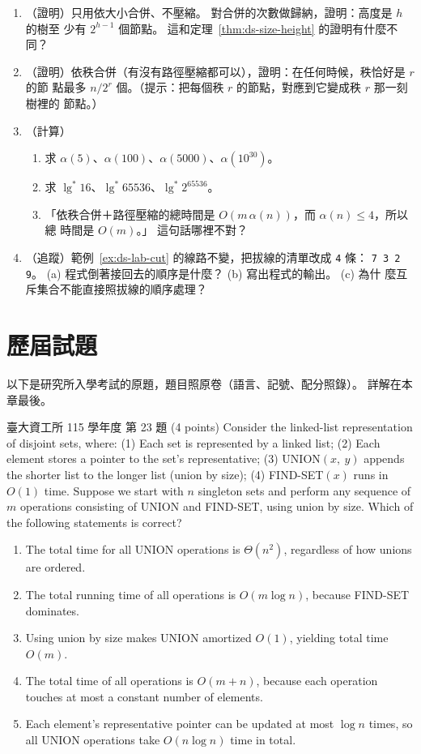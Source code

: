 \begin{enumerate}
\item （證明）只用依大小合併、不壓縮。 對合併的次數做歸納，證明：高度是 $h$ 的樹至
少有 $2^{h-1}$ 個節點。 這和定理~\ref{thm:ds-size-height} 的證明有什麼不同？

\item （證明）依秩合併（有沒有路徑壓縮都可以），證明：在任何時候，秩恰好是 $r$ 的節
點最多 $n / 2^r$ 個。（提示：把每個秩 $r$ 的節點，對應到它變成秩 $r$ 那一刻樹裡的
節點。）

\item （計算）
\begin{enumerate}
\item 求 $\alpha(5)$、$\alpha(100)$、$\alpha(5000)$、$\alpha(10^{30})$。
\item 求 $\lg^* 16$、$\lg^* 65536$、$\lg^* 2^{65536}$。
\item 「依秩合併＋路徑壓縮的總時間是 $O(m\,\alpha(n))$，而 $\alpha(n) \le 4$，所以總
時間是 $O(m)$。」 這句話哪裡不對？
\end{enumerate}

\item （追蹤）範例~\ref{ex:ds-lab-cut} 的線路不變，把拔線的清單改成 \texttt{4} 條：
\texttt{7 3 2 9}。 (a) 程式倒著接回去的順序是什麼？ (b) 寫出程式的輸出。 (c) 為什
麼互斥集合不能直接照拔線的順序處理？
\end{enumerate}

\section{歷屆試題}
\label{sec:ds-pastexam}

以下是研究所入學考試的原題，題目照原卷（語言、記號、配分照錄）。 詳解在本章最後。

\begin{pastexam}[label={px:ds-1}]{臺大資工所 115 學年度 第 23 題}
(4 points) Consider the linked-list representation of disjoint sets, where: (1) Each set is represented by a linked list; (2) Each element stores a pointer to the set's representative; (3) UNION$(x,\ y)$ appends the shorter list to the longer list (union by size); (4) FIND-SET$(x)$ runs in $O(1)$ time. Suppose we start with $n$ singleton sets and perform any sequence of $m$ operations consisting of UNION and FIND-SET, using union by size. Which of the following statements is correct?
\begin{enumerate}[label=(\Alph*),leftmargin=2.2em,itemsep=1pt]
\item The total time for all UNION operations is $\Theta(n^2)$, regardless of how unions are ordered.
\item The total running time of all operations is $O(m\log n)$, because FIND-SET dominates.
\item Using union by size makes UNION amortized $O(1)$, yielding total time $O(m)$.
\item The total time of all operations is $O(m+n)$, because each operation touches at most a constant number of elements.
\item Each element's representative pointer can be updated at most $\log n$ times, so all UNION operations take $O(n\log n)$ time in total.
\end{enumerate}
\end{pastexam}

